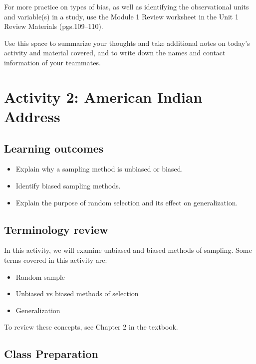 \documentclass[
]{report}
\begin{document}
For more practice on types of bias, as well as identifying the observational units and variable(s) in a study, use the Module 1 Review worksheet in the Unit 1 Review Materials (pgs.109--110).

Use this space to summarize your thoughts and take additional notes on today's activity and material covered, and to write down the names and contact information of your teammates.

\newpage

\section{Activity 2: American Indian Address}\label{activity-2-american-indian-address}


\subsection{Learning outcomes}\label{learning-outcomes-1}

\begin{itemize}
\item
  Explain why a sampling method is unbiased or biased.
\item
  Identify biased sampling methods.
\item
  Explain the purpose of random selection and its effect on generalization.
\end{itemize}

\subsection{Terminology review}\label{terminology-review-1}

In this activity, we will examine unbiased and biased methods of sampling. Some terms covered in this activity are:

\begin{itemize}
\item
  Random sample
\item
  Unbiased vs biased methods of selection
\item
  Generalization
\end{itemize}

To review these concepts, see Chapter 2 in the textbook.

\subsection{Class Preparation}\label{class-preparation}
\end{document}
